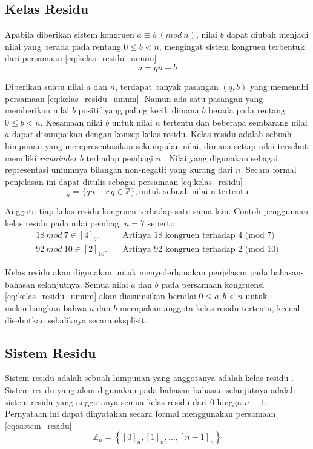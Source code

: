 \subsection{Kelas Residu}
Apabila diberikan sistem kongruen $a\equiv b\ (mod\ n)$, nilai $b$ dapat diubah menjadi nilai yang berada pada rentang $0\le b<n$, mengingat sistem kongruen terbentuk dari persamaan \eqref{eq:kelas_residu_umum}
\begin{equation}
a=qn+b
\label{eq:kelas_residu_umum}
\end{equation}

Diberikan suatu nilai $a$ dan $n$, terdapat banyak pasangan $(q,b)$ yang memenuhi persamaan \eqref{eq:kelas_residu_umum}. Namun ada satu pasangan yang memberikan nilai $b$ positif yang paling kecil, dimana $b$ berada pada rentang $0\le b<n$. Kesamaan nilai $b$ untuk nilai $n$ tertentu dan beberapa sembarang nilai $a$ dapat disampaikan dengan konsep kelas residu.
Kelas residu adalah sebuah himpunan yang merepresentasikan sekumpulan nilai, dimana setiap nilai tersebut memiliki \textit{remainder} $b$ terhadap pembagi $n$ \cite{cormen_introduction,stallings_cryptography}. Nilai yang digunakan sebagai representasi umumnya bilangan non-negatif yang kurang dari $n$. Secara formal penjelasan ini dapat ditulis sebagai persamaan \eqref{eq:kelas_residu}
\begin{equation}
[r]_n=\{qn+r\ q\in \mathbb{Z}\}, \text{untuk sebuah nilai n tertentu}
\label{eq:kelas_residu}
\end{equation}

Anggota tiap kelas residu kongruen terhadap satu sama lain. Contoh penggunaan kelas residu pada nilai pembagi $n = 7$ seperti:
\begin{align*}
18\ mod\ 7\in [4]_7. \quad& \text{Artinya 18 kongruen terhadap 4 (mod 7)} \\
92\ mod\ 10\in [2]_{10}. \quad& \text{Artinya 92 kongruen terhadap 2 (mod 10)}
\end{align*}

Kelas residu akan digunakan untuk menyederhanakan penjelasan pada bahasan-bahasan selanjutnya. Semua nilai $a$ dan $b$ pada persamaan kongruensi \eqref{eq:kelas_residu_umum} akan diasumsikan bernilai $0\leq a,b < n$ untuk melambangkan bahwa $a$ dan $b$ merupakan anggota kelas residu tertentu, kecuali disebutkan sebaliknya secara eksplisit.

\subsection{Sistem Residu}
Sistem residu adalah sebuah himpunan yang anggotanya adalah kelas residu \cite{stallings_cryptography,cormen_introduction}. Sistem residu yang akan digunakan pada bahasan-bahasan selanjutnya adalah sistem residu yang anggotanya semua kelas residu dari 0 hingga $n - 1$. Pernyataan ini dapat dinyatakan secara formal menggunakan persamaan \eqref{eq:sistem_residu}
\begin{equation}
\mathbb{Z}_n=\left\lbrace[0]_n,[1]_n,\dots,[n-1]_n\right\rbrace
\label{eq:sistem_residu}
\end{equation}


